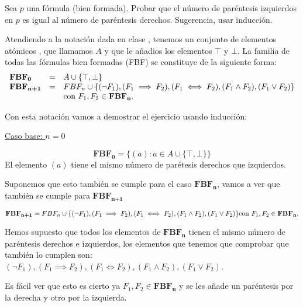 	\begin{problem}
	 Sea $p$ una f\'ormula (bien formada). Probar que el n\'umero de par\'entesis izquierdos en
	$p$ es igual al  n\'umero de par\'entesis derechos. Sugerencia, usar inducci\'on. 
	\solution
	
	Atendiendo a la notación dada en clase , tenemos un conjunto de elementos atómicos , que llamamos $A$ y que le añadios los elementos $\top$ y $\bot$. La familia de todas las fórmulas bien formadas (FBF) se constituye de la siguiente forma:
\begin{equation*}
	\begin{array}{l l l}
		\textbf{FBF}_\textbf{0} &=& A\cup\{\top, \perp \}\\
		\textbf{FBF}_\textbf{n+1} &=& FBF_n \cup \{(\neg F_1), (F_1\implies F_2),(F_1\iff F_2),(F_1\wedge F_2),(F_1\vee F_2)\}\\ &&\text{con } F_1,F_2\in \textbf{FBF}_\textbf{n}.
	\end{array}
\end{equation*}

Con esta notación vamos a demostrar el ejercicio usando inducción:

\underline{Caso base: $n=0$}

$$\textbf{FBF}_\textbf{0} = \{(a) : a\in A \cup \{\top , \bot\}\}$$
El elemento $(a)$ tiene el mismo número de parétesis derechos que izquierdos.

Suponemos que esto también se cumple para el caso $\textbf{FBF}_\textbf{n}$, vamos a ver que también se cumple para $\textbf{FBF}_\textbf{n+1}$

$$\textbf{FBF}_\textbf{n+1} = FBF_n \cup \{(\neg F_1), (F_1\implies F_2),(F_1\iff F_2),(F_1\wedge F_2),(F_1\vee F_2)\}\\ \text{con } F_1,F_2\in \textbf{FBF}_\textbf{n}.$$

Hemos supuesto que todos los elementos de $\textbf{FBF}_\textbf{n}$ tienen el mismo número de paréntesis derechos e izquierdos, los elementos que tenemos que comprobar que también lo cumplen son:$(\neg F_1), (F_1\implies F_2),(F_1\iff F_2),(F_1\wedge F_2),(F_1\vee F_2)$.

Es fácil ver que esto es cierto ya $ F_1,F_2\in \textbf{FBF}_\textbf{n}$ y se les añade un paréntesis por la derecha y otro por la izquierda.
	\end{problem}